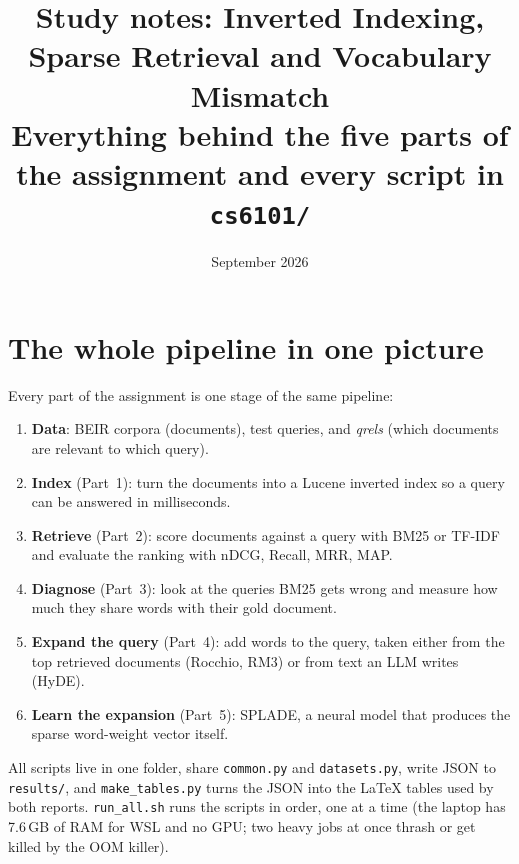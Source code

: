 \documentclass[11pt,a4paper]{article}
\title{Study notes: Inverted Indexing, Sparse Retrieval and Vocabulary Mismatch\\
\large Everything behind the five parts of the assignment and every script in \texttt{cs6101/}}
\date{September 2026}
\begin{document}
\maketitle
\tableofcontents

\section{The whole pipeline in one picture}
Every part of the assignment is one stage of the same pipeline:
\begin{enumerate}[nosep]
  \item \textbf{Data}: BEIR corpora (documents), test queries, and \emph{qrels} (which documents are relevant to which query).
  \item \textbf{Index} (Part~1): turn the documents into a Lucene inverted index so a query can be answered in milliseconds.
  \item \textbf{Retrieve} (Part~2): score documents against a query with BM25 or TF-IDF and evaluate the ranking with nDCG, Recall, MRR, MAP.
  \item \textbf{Diagnose} (Part~3): look at the queries BM25 gets wrong and measure how much they share words with their gold document.
  \item \textbf{Expand the query} (Part~4): add words to the query, taken either from the top retrieved documents (Rocchio, RM3) or from text an LLM writes (HyDE).
  \item \textbf{Learn the expansion} (Part~5): SPLADE, a neural model that produces the sparse word-weight vector itself.
\end{enumerate}
All scripts live in one folder, share \texttt{common.py} and \texttt{datasets.py}, write JSON to \texttt{results/}, and
\texttt{make\_tables.py} turns the JSON into the LaTeX tables used by both reports. \texttt{run\_all.sh} runs the scripts in order,
one at a time (the laptop has 7.6\,GB of RAM for WSL and no GPU; two heavy jobs at once thrash or get killed by the OOM killer).
\end{document}

